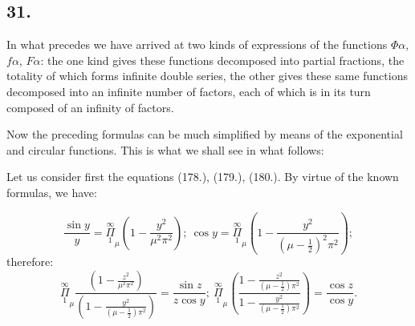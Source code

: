 \documentclass{article}
\begin{document}
\subsection*{31.}

In what precedes we have arrived at two kinds of expressions of the functions $\Phi\alpha$, $f\alpha$, $F\alpha$: the one kind gives these functions decomposed into partial fractions, the totality of which forms infinite double series, the other gives these same functions decomposed into an infinite number of factors, each of which is in its turn composed of an infinity of factors.

Now the preceding formulas can be much simplified by means of the exponential and circular functions. This is what we shall see in what follows:

Let us consider first the equations (178.), (179.), (180.). By virtue of the known formulas, we have:

\[
\frac{\sin y}{y} = \overset{\infty}{\underset{1}{\Pi}}_{\mu}\left(1-\frac{y^{2}}{\mu^{2}\pi^{2}}\right);\ \cos y = \overset{\infty}{\underset{1}{\Pi}}_{\mu}\left(1-\frac{y^{2}}{(\mu-\tfrac{1}{2})^{2}\pi^{2}}\right);
\]
therefore:
\[
\overset{\infty}{\underset{1}{\Pi}}_{\mu}\frac{\left(1-\frac{z^{2}}{\mu^{2}\pi^{2}}\right)}{\left(1-\frac{y^{2}}{(\mu-\tfrac{1}{2})\pi^{2}}\right)} = \frac{\sin z}{z\cos y};\ \overset{\infty}{\underset{1}{\Pi}}_{\mu}\left(\frac{1-\frac{z^{2}}{(\mu-\tfrac{1}{2})\pi^{2}}}{1-\frac{y^{2}}{(\mu-\tfrac{1}{2})\pi^{2}}}\right) = \frac{\cos z}{\cos y}.
\]
\end{document}
